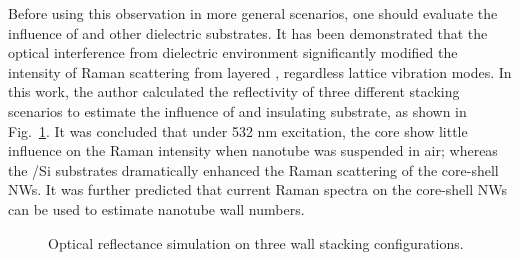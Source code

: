 Before using this observation in more general scenarios, one should evaluate the influence of  and other dielectric substrates. It has been demonstrated that the optical interference from dielectric environment significantly modified the intensity of Raman scattering from layered , regardless lattice vibration modes.\cite{Li2012} In this work, the author calculated the reflectivity of three different stacking scenarios to estimate the influence of  and insulating substrate, as shown in Fig.~\ref{fig:ch5ws2stk}. It was concluded that under 532 nm excitation, the  core show little influence on the Raman intensity when  nanotube was suspended in air; whereas the /Si substrates dramatically enhanced the Raman scattering of the core-shell NWs. It was further predicted that current Raman spectra on the core-shell NWs can be used to estimate  nanotube wall numbers. 

\begin{figure}[htb]
\centering
{}\hspace{0.03\textwidth}
\hspace{0.03\textwidth}
\caption[Optical reflectance simulation on three stacking configurations]{Optical reflectance simulation on three   wall stacking configurations.}
\label{fig:ch5ws2stk}
\end{figure}

